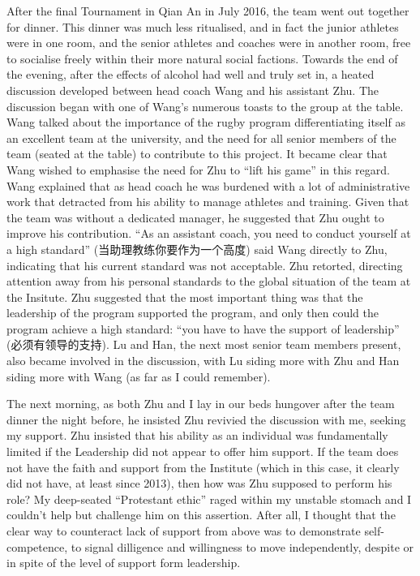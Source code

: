 After the final Tournament in Qian An in July 2016, the team went out together for dinner.  This dinner was much less ritualised, and in fact the junior athletes were in one room, and the senior athletes and coaches were in another room, free to socialise freely within their more natural social factions.  Towards the end of the evening, after the effects of alcohol had well and truly set in, a heated discussion developed between head coach Wang and his assistant Zhu. The discussion began with one of Wang's numerous toasts to the group at the table. Wang talked about the importance of the rugby program differentiating itself as an excellent team at the university, and the need for all senior members of the team (seated at the table) to contribute to this project.  It became clear that Wang wished to emphasise the need for Zhu to ``lift his game'' in this regard. Wang explained that as head coach he was burdened with a lot of administrative work that detracted from his ability to manage athletes and training.  Given that the team was without a dedicated manager, he suggested that Zhu ought to improve his contribution. ``As an assistant coach, you need to conduct yourself at a high standard'' (当助理教练你要作为一个高度) said Wang directly to Zhu, indicating that his current standard was not acceptable.  Zhu retorted, directing attention away from his personal standards to the global situation of the team at the Insitute.  Zhu suggested that the most important thing was that the leadership of the program supported the program, and only then could the program achieve a high standard: ``you have to have the support of leadership'' (必须有领导的支持).  Lu and Han, the next most senior team members present, also became involved in the discussion, with Lu siding more with Zhu and Han siding more with Wang (as far as I could remember).

The next morning, as both Zhu and I lay in our beds hungover after the team dinner the night before, he insisted Zhu revivied the discussion with me, seeking my support.   Zhu insisted that his ability as an individual was fundamentally limited if the Leadership did not appear to offer him support.  If the team does not have the faith and support from the Institute (which in this case, it clearly did not have, at least since 2013), then how was Zhu supposed to perform his role? My deep-seated ``Protestant ethic'' raged within my unstable stomach and I couldn't help but challenge him on this assertion.  After all, I thought that the clear way to counteract lack of support from above was to demonstrate self-competence, to signal dilligence and willingness to move independently, despite or in spite of the level of support form leadership.

